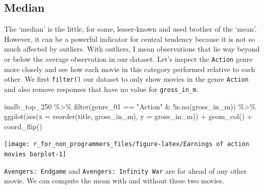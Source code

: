 \documentclass[
]{book}
\newenvironment{Shaded}{\begin{snugshade}}{\end{snugshade}}
\newcommand{\AttributeTok}[1]{\textcolor[rgb]{0.77,0.63,0.00}{#1}}
\newcommand{\FunctionTok}[1]{\textcolor[rgb]{0.00,0.00,0.00}{#1}}
\newcommand{\NormalTok}[1]{#1}
\newcommand{\SpecialCharTok}[1]{\textcolor[rgb]{0.00,0.00,0.00}{#1}}
\newcommand{\StringTok}[1]{\textcolor[rgb]{0.31,0.60,0.02}{#1}}
\begin{document}
\hypertarget{median}{%
\subsection{Median}\label{median}}

The `median' is the little, for some, lesser-known and used brother of the `mean'. However, it can be a powerful indicator for central tendency because it is not so much affected by outliers. With outliers, I mean observations that lie way beyond or below the average observation in our dataset. Let's inspect the \texttt{Action} genre more closely and see how each movie in this category performed relative to each other. We first \texttt{filter()} our dataset to only show movies in the genre \texttt{Action} and also remove responses that have no value for \texttt{gross\_in\_m}.

\begin{Shaded}
\begin{Highlighting}[]
\NormalTok{imdb\_top\_250 }\SpecialCharTok{\%\textgreater{}\%}
  \FunctionTok{filter}\NormalTok{(genre\_01 }\SpecialCharTok{==} \StringTok{"Action"} \SpecialCharTok{\&} \SpecialCharTok{!}\FunctionTok{is.na}\NormalTok{(gross\_in\_m)) }\SpecialCharTok{\%\textgreater{}\%}
  \FunctionTok{ggplot}\NormalTok{(}\FunctionTok{aes}\NormalTok{(}\AttributeTok{x =} \FunctionTok{reorder}\NormalTok{(title, gross\_in\_m), }\AttributeTok{y =}\NormalTok{ gross\_in\_m)) }\SpecialCharTok{+}
  \FunctionTok{geom\_col}\NormalTok{() }\SpecialCharTok{+}
  \FunctionTok{coord\_flip}\NormalTok{()}
\end{Highlighting}
\end{Shaded}

\begin{center}\texttt{[image: r\_for\_non\_programmers\_files/figure-latex/Earnings of action movies barplot-1]} \end{center}

\texttt{Avengers:\ Endgame} and \texttt{Avengers:\ Infinity\ War} are far ahead of any other movie. We can compute the mean with and without these two movies.
\end{document}
